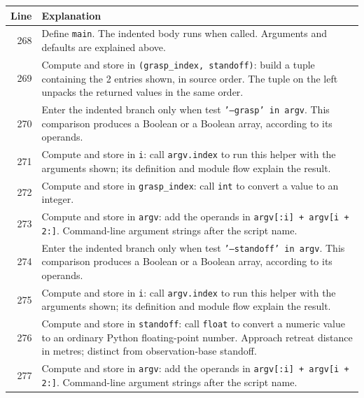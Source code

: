 \documentclass[11pt,a4paper]{book}
\begin{document}
\begin{longtable}{r p{}}

\textbf{Line} & \textbf{Explanation} \\ \hline \endhead

268 & Define \texttt{main}. The indented body runs when called. Arguments and defaults are explained above. \\

269 & Compute and store in \texttt{(grasp\_index, standoff)}: build a tuple containing the 2 entries shown, in source order. The tuple on the left unpacks the returned values in the same order. \\

270 & Enter the indented branch only when test \texttt{'--grasp' in argv}. This comparison produces a Boolean or a Boolean array, according to its operands. \\

271 & Compute and store in \texttt{i}: call \texttt{argv.index} to run this helper with the arguments shown; its definition and module flow explain the result.  \\

272 & Compute and store in \texttt{grasp\_index}: call \texttt{int} to convert a value to an integer.  \\

273 & Compute and store in \texttt{argv}: add the operands in \texttt{argv[:i] + argv[i + 2:]}. Command-line argument strings after the script name. \\

274 & Enter the indented branch only when test \texttt{'--standoff' in argv}. This comparison produces a Boolean or a Boolean array, according to its operands. \\

275 & Compute and store in \texttt{i}: call \texttt{argv.index} to run this helper with the arguments shown; its definition and module flow explain the result.  \\

276 & Compute and store in \texttt{standoff}: call \texttt{float} to convert a numeric value to an ordinary Python floating-point number. Approach retreat distance in metres; distinct from observation-base standoff. \\

277 & Compute and store in \texttt{argv}: add the operands in \texttt{argv[:i] + argv[i + 2:]}. Command-line argument strings after the script name. \\


\end{longtable}
\end{document}
